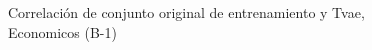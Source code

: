 \begin{figure}[H]
    \centering
    
    \caption{Correlación de conjunto original de entrenamiento y Tvae, Economicos (B-1)}
    \label{pairwise-economicos-b-1-tvae}
\end{figure}